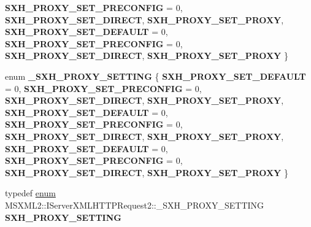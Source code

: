 \begin{DoxyCompactItemize}
{\bfseries S\+X\+H\+\_\+\+P\+R\+O\+X\+Y\+\_\+\+S\+E\+T\+\_\+\+P\+R\+E\+C\+O\+N\+F\+IG} = 0, 
{\bfseries S\+X\+H\+\_\+\+P\+R\+O\+X\+Y\+\_\+\+S\+E\+T\+\_\+\+D\+I\+R\+E\+CT}, 
{\bfseries S\+X\+H\+\_\+\+P\+R\+O\+X\+Y\+\_\+\+S\+E\+T\+\_\+\+P\+R\+O\+XY}, 
\newline
{\bfseries S\+X\+H\+\_\+\+P\+R\+O\+X\+Y\+\_\+\+S\+E\+T\+\_\+\+D\+E\+F\+A\+U\+LT} = 0, 
{\bfseries S\+X\+H\+\_\+\+P\+R\+O\+X\+Y\+\_\+\+S\+E\+T\+\_\+\+P\+R\+E\+C\+O\+N\+F\+IG} = 0, 
{\bfseries S\+X\+H\+\_\+\+P\+R\+O\+X\+Y\+\_\+\+S\+E\+T\+\_\+\+D\+I\+R\+E\+CT}, 
{\bfseries S\+X\+H\+\_\+\+P\+R\+O\+X\+Y\+\_\+\+S\+E\+T\+\_\+\+P\+R\+O\+XY}
 \}
\item 
\mbox{\label{interface_m_s_x_m_l2_1_1_i_server_x_m_l_h_t_t_p_request2_ae6e4737a5b11c735e4879f48c0814be5}} 
enum {\bfseries \+\_\+\+S\+X\+H\+\_\+\+P\+R\+O\+X\+Y\+\_\+\+S\+E\+T\+T\+I\+NG} \{ \newline
{\bfseries S\+X\+H\+\_\+\+P\+R\+O\+X\+Y\+\_\+\+S\+E\+T\+\_\+\+D\+E\+F\+A\+U\+LT} = 0, 
{\bfseries S\+X\+H\+\_\+\+P\+R\+O\+X\+Y\+\_\+\+S\+E\+T\+\_\+\+P\+R\+E\+C\+O\+N\+F\+IG} = 0, 
{\bfseries S\+X\+H\+\_\+\+P\+R\+O\+X\+Y\+\_\+\+S\+E\+T\+\_\+\+D\+I\+R\+E\+CT}, 
{\bfseries S\+X\+H\+\_\+\+P\+R\+O\+X\+Y\+\_\+\+S\+E\+T\+\_\+\+P\+R\+O\+XY}, 
\newline
{\bfseries S\+X\+H\+\_\+\+P\+R\+O\+X\+Y\+\_\+\+S\+E\+T\+\_\+\+D\+E\+F\+A\+U\+LT} = 0, 
{\bfseries S\+X\+H\+\_\+\+P\+R\+O\+X\+Y\+\_\+\+S\+E\+T\+\_\+\+P\+R\+E\+C\+O\+N\+F\+IG} = 0, 
{\bfseries S\+X\+H\+\_\+\+P\+R\+O\+X\+Y\+\_\+\+S\+E\+T\+\_\+\+D\+I\+R\+E\+CT}, 
{\bfseries S\+X\+H\+\_\+\+P\+R\+O\+X\+Y\+\_\+\+S\+E\+T\+\_\+\+P\+R\+O\+XY}, 
\newline
{\bfseries S\+X\+H\+\_\+\+P\+R\+O\+X\+Y\+\_\+\+S\+E\+T\+\_\+\+D\+E\+F\+A\+U\+LT} = 0, 
{\bfseries S\+X\+H\+\_\+\+P\+R\+O\+X\+Y\+\_\+\+S\+E\+T\+\_\+\+P\+R\+E\+C\+O\+N\+F\+IG} = 0, 
{\bfseries S\+X\+H\+\_\+\+P\+R\+O\+X\+Y\+\_\+\+S\+E\+T\+\_\+\+D\+I\+R\+E\+CT}, 
{\bfseries S\+X\+H\+\_\+\+P\+R\+O\+X\+Y\+\_\+\+S\+E\+T\+\_\+\+P\+R\+O\+XY}
 \}
\item 
\mbox{\label{interface_m_s_x_m_l2_1_1_i_server_x_m_l_h_t_t_p_request2_a0b93602ed90431b36175e8233499c1cb}} 
typedef \hyperlink{interfaceenum}{enum} M\+S\+X\+M\+L2\+::\+I\+Server\+X\+M\+L\+H\+T\+T\+P\+Request2\+::\+\_\+\+S\+X\+H\+\_\+\+P\+R\+O\+X\+Y\+\_\+\+S\+E\+T\+T\+I\+NG {\bfseries S\+X\+H\+\_\+\+P\+R\+O\+X\+Y\+\_\+\+S\+E\+T\+T\+I\+NG}

\end{DoxyCompactItemize}
